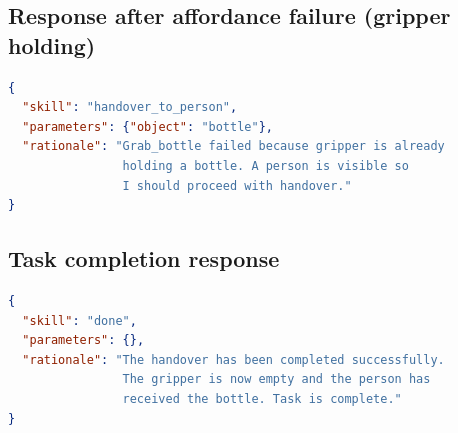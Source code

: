 \documentclass[12pt,a4paper]{report}
\begin{document}
\subsection*{Response after affordance failure (gripper holding)}

\begin{lstlisting}[language=JSON]
{
  "skill": "handover_to_person",
  "parameters": {"object": "bottle"},
  "rationale": "Grab_bottle failed because gripper is already
                holding a bottle. A person is visible so
                I should proceed with handover."
}
\end{lstlisting}

\subsection*{Task completion response}

\begin{lstlisting}[language=JSON]
{
  "skill": "done",
  "parameters": {},
  "rationale": "The handover has been completed successfully.
                The gripper is now empty and the person has
                received the bottle. Task is complete."
}
\end{lstlisting}
\end{document}
